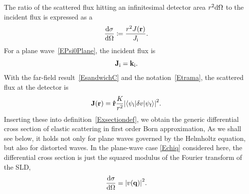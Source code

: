 %
The ratio of the scattered flux hitting an infinitesimal detector area
$r^2\mathrm d\Omega$ to the incident flux is expressed as a
%
%
%
\begin{equation}\label{Exsectiondef}
  \frac{\mathrm d\sigma}{\mathrm d\Omega}
  \coloneqq  \frac{r^2 J(\mathbf{r})}{J_{\text{i}}}.
\end{equation}
%
%
For a plane wave~\cref{EPsi0Plane}, the incident flux is
%
%
\begin{equation}\label{EJi}
  \mathbf{J}_{\text{i}} = \mathbf{k}_{\text{i}}.
\end{equation}
With the far-field result~\cref{EsandwichC}
and the notation~\cref{Etrama},
the scattered flux at the detector is
\begin{equation}\label{EJr}
  \mathbf{J}(\mathbf{r})
  = \mathbf{\hat r}\frac{K}{r^2}
    {\left|\braket{\psi_{\text{i}}|\delta v|\psi_{\text{f}}}\right|}^2.
\end{equation}
%
Inserting these into definition~\cref{Exsectiondef},
we obtain the generic differential cross section
of elastic scattering in first order Born approximation,
%
%
%
As we shall see below,
it holds not only for plane waves governed
by the Helmholtz equation,
but also for distorted waves.
%
In the plane-wave case \cref{Echiq} considered here,
the differential cross section is just the squared modulus
of the Fourier transform of the SLD,
%
\begin{equation}\label{Ecross1}
  \frac{\mathrm d\sigma}{\mathrm d\Omega}
  = {\left| v(\mathbf{q}) \right|}^2.
\end{equation}

